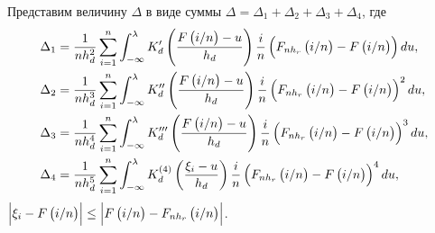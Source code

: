 \documentclass[a4paper,14pt,russian]{article}
\begin{document}
 Представим величину $\Delta$ в виде суммы $\Delta= \Delta_{1} + \Delta_{2}+ \Delta_{3}+ \Delta_{4}$, где
 \begin{align}
   \Delta_{1} &= \frac{1}{n h_d^2} \sum_{i =1}^n \int_{-\infty}^{\lambda}K_d'\left(\frac{F\left(i/n\right)-u}{h_d}\right)\frac{i}{n }\left(F_{n h_r}\left(i/n\right)- F\left(i/n\right)\right)du, \label{Delta11}\\
   \Delta_{2} &=\frac{1}{n h_d^3} \sum_{i =1}^n \int_{-\infty}^{\lambda}K_d''\left(\frac{F\left(i/n\right)-u}{h_d}\right)\frac{i}{n }\left(F_{n h_r}\left(i/n\right)- F\left(i/n\right)\right)^2du,\label{Delta12}\\
   \Delta_{3} &=\frac{1}{n h_d^4} \sum_{i =1}^n \int_{-\infty}^{\lambda}K_d'''\left(\frac{F\left(i/n\right)-u}{h_d}\right)\frac{i}{n }\left(F_{n h_r}\left(i/n\right)- F\left(i/n\right)\right)^3du,\label{Delta13}\\
   \Delta_{4} &=\frac{1}{n h_d^5} \sum_{i =1}^n \int_{-\infty}^{\lambda}K_d^{(4)}\left(\frac{\xi_i-u}{h_d}\right)\frac{i}{n }\left(F_{n h_r}\left(i/n\right)- F\left(i/n\right)\right)^4du,\label{Delta14}
 \end{align}
 $ \left|\xi_i - F\left(i/n\right)\right|\leq \left|F\left(i/n\right)-F_{n h_r}\left(i/n\right)\right|$.
\end{document}
